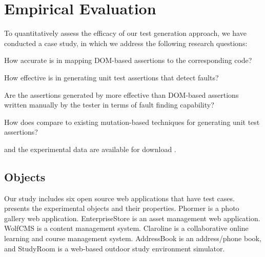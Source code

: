 \section{Empirical Evaluation} \label{Sec:evaluation}
To quantitatively assess the efficacy of our test generation approach, we have conducted a case study, in which we address the following research questions:

\begin{description}[noitemsep]
\item [RQ1] How accurate is \tool in mapping DOM-based assertions to the corresponding \javascript code?
\item [RQ2] How effective is \tool in generating unit test assertions that detect faults?
\item [RQ3] Are the assertions generated by \tool more effective than DOM-based assertions written manually by the tester in terms of fault finding capability? 
\item [RQ4] How does \tool compare to existing mutation-based techniques for generating unit test assertions?
\end{description}

\tool and the experimental data are available for download \cite{atrina-dl}.
\subsection{Objects}
Our study includes six open source \javascript web applications that have \selenium test cases.
 presents the experimental objects and their properties. Phormer \cite{phormer} is a photo gallery web application. EnterpriseStore \cite{enterpriseStore} is an asset management web application. WolfCMS \cite{wolfcms} is a content management system. Claroline \cite{claroline} is a collaborative online learning and course management system.
AddressBook \cite{addressBook} is an address/phone book, and StudyRoom \cite{studyRoom} is a web-based outdoor study environment simulator. 

